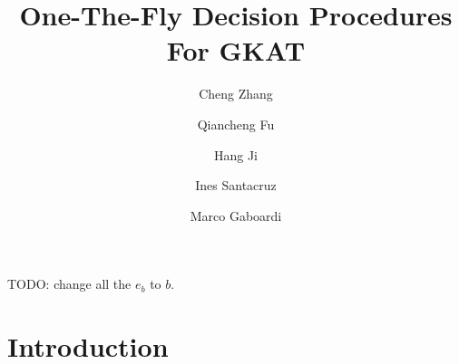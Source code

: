 \documentclass{extarticle}
\begin{document}
\title{One-The-Fly Decision Procedures For GKAT}         
 


\author{
    Cheng Zhang \and 
    Qiancheng Fu \and
    Hang Ji \and 
    Ines Santacruz \and 
    Marco Gaboardi
}
\date{}

\maketitle


\begin{abstract}
\end{abstract}

TODO: change all the \(e_b\) to \(b\).



\section{Introduction}
\end{document}
